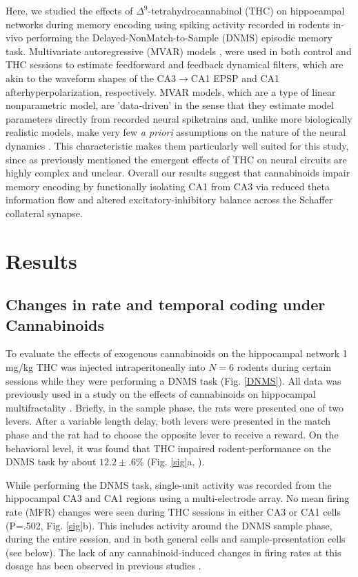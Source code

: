 \documentclass[11pt,a4paper,final]{article}
\begin{document}
Here, we studied the effects of $\Delta^9$-tetrahydrocannabinol (THC) on hippocampal networks during memory encoding using spiking activity recorded in rodents in-vivo performing the Delayed-NonMatch-to-Sample (DNMS) episodic memory task.
Multivariate autoregressive (MVAR) models \citep{sandler14}, were used in both control and THC sessions to estimate feedforward and feedback dynamical filters, which are akin to the waveform shapes of the CA3$\to$CA1 EPSP and CA1 afterhyperpolarization, respectively.
MVAR models, which are a type of linear nonparametric model, are 'data-driven' in the sense that they estimate model parameters directly from recorded neural spiketrains and, unlike more biologically realistic models, make very few \textit{a priori} assumptions on the nature of the neural dynamics \citep{marm04,song09par1}.
This characteristic makes them particularly well suited for this study, since as previously mentioned the emergent effects of THC on neural circuits are highly complex and unclear.
Overall our results suggest that cannabinoids impair memory encoding by functionally isolating CA1 from CA3 via reduced theta information flow and altered excitatory-inhibitory balance across the Schaffer collateral synapse.

\section{Results \label{results}}

    \subsection{Changes in rate and temporal coding under Cannabinoids}

To evaluate the effects of exogenous cannabinoids on the hippocampal network 1 mg/kg THC was injected intraperitoneally into $N=6$ rodents during certain sessions while they were performing a DNMS task (Fig. \ref{DNMS}).
All data was previously used in a study on the effects of cannabinoids on hippocampal multifractality \citep{dustin14,dustin15}.
Briefly, in the sample phase, the rats were presented one of two levers. 
After a variable length delay, both levers were presented in the match phase and the rat had to choose the opposite lever to receive a reward. 
On the behavioral level, it was found that THC impaired rodent-performance on the DNMS task by about $12.2\pm.6\%$ (Fig. \ref{sig}a, \citep{hampson00}).

While performing the DNMS task, single-unit activity was recorded from the hippocampal CA3 and CA1 regions using a multi-electrode array.
No mean firing rate (MFR) changes were seen during THC sessions in either CA3 or CA1 cells (P=.502, Fig. \ref{sig}b).
This includes activity around the DNMS sample phase, during the entire session, and in both general cells and sample-presentation cells (see below).
The lack of any cannabinoid-induced changes in firing rates at this dosage has been observed in previous studies \citep{robbe06,goon10}.
\end{document}
